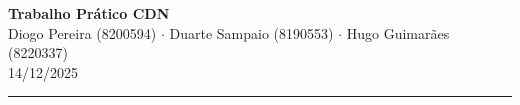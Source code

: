 \documentclass[10pt,a4paper,titlepage]{article}
\begin{document}
	
\thispagestyle{empty} %


\begin{center}
	{\Large \textbf{Trabalho Prático CDN}} \\ \vspace{0.15cm}
	\small Diogo Pereira (8200594) $\cdot$ Duarte Sampaio (8190553) $\cdot$ Hugo Guimarães (8220337) \\ \vspace{0.01cm}
	\small 14/12/2025
\end{center}
\hrule %
\vspace{0.5cm} %








\end{document}

